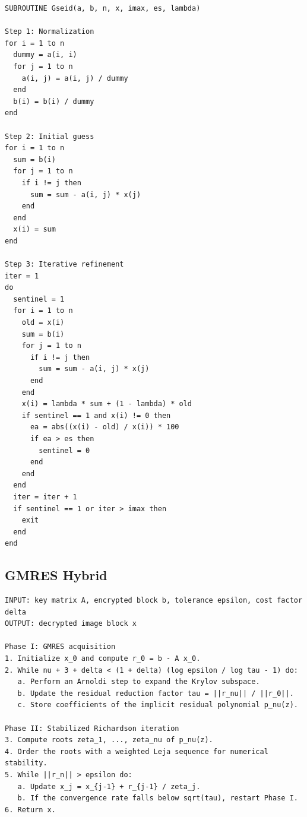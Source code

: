 \begin{lstlisting}
SUBROUTINE Gseid(a, b, n, x, imax, es, lambda)

Step 1: Normalization
for i = 1 to n
  dummy = a(i, i)
  for j = 1 to n
    a(i, j) = a(i, j) / dummy
  end
  b(i) = b(i) / dummy
end

Step 2: Initial guess
for i = 1 to n
  sum = b(i)
  for j = 1 to n
    if i != j then
      sum = sum - a(i, j) * x(j)
    end
  end
  x(i) = sum
end

Step 3: Iterative refinement
iter = 1
do
  sentinel = 1
  for i = 1 to n
    old = x(i)
    sum = b(i)
    for j = 1 to n
      if i != j then
        sum = sum - a(i, j) * x(j)
      end
    end
    x(i) = lambda * sum + (1 - lambda) * old
    if sentinel == 1 and x(i) != 0 then
      ea = abs((x(i) - old) / x(i)) * 100
      if ea > es then
        sentinel = 0
      end
    end
  end
  iter = iter + 1
  if sentinel == 1 or iter > imax then
    exit
  end
end
\end{lstlisting}

\subsection{GMRES Hybrid}


\begin{lstlisting}
INPUT: key matrix A, encrypted block b, tolerance epsilon, cost factor delta
OUTPUT: decrypted image block x

Phase I: GMRES acquisition
1. Initialize x_0 and compute r_0 = b - A x_0.
2. While nu + 3 + delta < (1 + delta) (log epsilon / log tau - 1) do:
   a. Perform an Arnoldi step to expand the Krylov subspace.
   b. Update the residual reduction factor tau = ||r_nu|| / ||r_0||.
   c. Store coefficients of the implicit residual polynomial p_nu(z).

Phase II: Stabilized Richardson iteration
3. Compute roots zeta_1, ..., zeta_nu of p_nu(z).
4. Order the roots with a weighted Leja sequence for numerical stability.
5. While ||r_n|| > epsilon do:
   a. Update x_j = x_{j-1} + r_{j-1} / zeta_j.
   b. If the convergence rate falls below sqrt(tau), restart Phase I.
6. Return x.
\end{lstlisting}